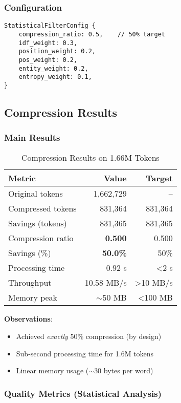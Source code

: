 \subsubsection{Configuration}

\begin{verbatim}
StatisticalFilterConfig {
    compression_ratio: 0.5,    // 50% target
    idf_weight: 0.3,
    position_weight: 0.2,
    pos_weight: 0.2,
    entity_weight: 0.2,
    entropy_weight: 0.1,
}
\end{verbatim}

\subsection{Compression Results}

\subsubsection{Main Results}

\begin{table}[h]
\centering
\caption{Compression Results on 1.66M Tokens}
\label{tab:main-results}
\begin{tabular}{lrr}
\toprule
Metric & Value & Target \\
\midrule
Original tokens & 1,662,729 & -- \\
Compressed tokens & 831,364 & 831,364 \\
Savings (tokens) & 831,365 & 831,365 \\
Compression ratio & \textbf{0.500} & 0.500 \\
Savings (\%) & \textbf{50.0\%} & 50\% \\
\midrule
Processing time & 0.92 s & <2 s \\
Throughput & 10.58 MB/s & >10 MB/s \\
Memory peak & $\sim$50 MB & <100 MB \\
\bottomrule
\end{tabular}
\end{table}

\textbf{Observations}:
\begin{itemize}
    \item Achieved \textit{exactly} 50\% compression (by design)
    \item Sub-second processing time for 1.6M tokens
    \item Linear memory usage ($\sim$30 bytes per word)
\end{itemize}

\subsubsection{Quality Metrics (Statistical Analysis)}

